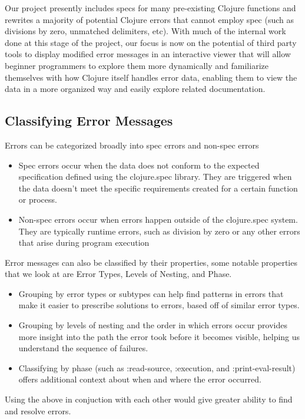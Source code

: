 \documentclass[12pt]{article}
\begin{document}
Our project presently includes specs for many pre-existing Clojure functions and rewrites a majority of potential Clojure errors that cannot employ spec (such as divisions by zero, unmatched delimiters, etc). With much of the internal work done at this stage of the project, our focus is now on the potential of third party tools to display modified error messages in an interactive viewer that will allow beginner programmers to explore them more dynamically and familiarize themselves with how Clojure itself handles error data, enabling them to view the data in a more organized way and easily explore related documentation.

\subsection{Classifying Error Messages}\label{subsec:classification}

Errors can be categorized broadly into spec errors and non-spec errors
\begin{itemize}

	\item Spec errors occur when the data does not conform to the expected specification defined using the clojure.spec library. They are triggered when the data doesn't meet the specific requirements created for a certain function or process.
	
	\item Non-spec errors occur when errors happen outside of the clojure.spec system. They are typically runtime errors, such as division by zero or any other errors that arise during program execution

\end{itemize}

Error messages can also be classified by their properties, some notable properties that we look at are Error Types, Levels of Nesting, and Phase.
\begin{itemize}
	\item Grouping by error types or subtypes can help find patterns in errors that make it easier to prescribe solutions to errors, based off of similar error types.
	\item Grouping by levels of nesting and the order in which errors occur provides more insight into the path the error took before it becomes visible, helping us understand the sequence of failures.
	\item Classifying by phase (such as :read-source, :execution, and :print-eval-result) offers additional context about when and where the error occurred.
\end{itemize}
Using the above in conjuction with each other would give greater ability to find and resolve errors.
\end{document}
